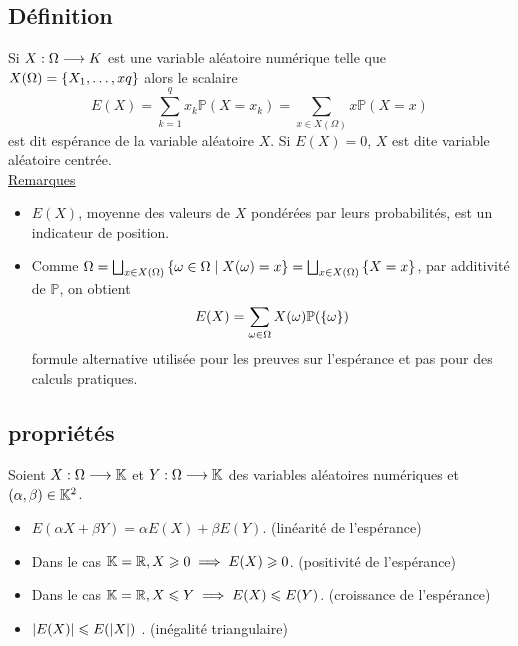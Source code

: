 \subsection{Définition}
\begin{defprop}
    Si \(X : \Omega \to \\K\) est une variable aléatoire numérique telle que \(X(\Omega) = \accol{X_1, \dots , xq}\) alors le scalaire
        \[E(X) = \sum^q_{k=1} x_k\mathbb{P}(X = x_k) = \sum_{x\in X(\Omega)}x\mathbb{P}(X = x)\]
    est dit espérance de la variable aléatoire \(X\). Si \(E(X) = 0\), \(X\) est dite variable aléatoire centrée.\\
    \underline{Remarques}\\
    \begin{itemize}
        \item \(E(X)\), moyenne des valeurs de \(X\) pondérées par leurs probabilités, est un indicateur de position.
        \item Comme \(\Omega = \bigsqcup _{x\in X(\Omega)} \accol{\omega \in  \Omega \tq X(\omega) = x} = \bigsqcup _{x\in X(\Omega)} \accol{X = x}\), par additivité de \(\mathbb{P}\), on obtient \[E(X) = \sum_{\omega\in \Omega} X(\omega)\mathbb{P} (\accol{\omega})\]
        formule alternative utilisée pour les preuves sur l’espérance et pas pour des calculs pratiques.
    \end{itemize}
\end{defprop}
\subsection{propriétés}
\begin{prop}
    Soient \(X : \Omega \to \K\) et \(Y : \Omega \to \K\) des variables aléatoires numériques et \((\alpha , \beta ) \in  \K^2\).
    \begin{itemize}
        \item \(E(\alpha X + \beta Y ) = \alpha E(X) + \beta E(Y ).\) \hfill (linéarité de l’espérance)
        \item Dans le cas \(\K = \R, X \geq 0 \imp E(X) \geq 0\). \hfill (positivité de l’espérance)
        \item Dans le cas \(\K = \R, X \leq Y \imp E(X) \leq E(Y )\). \hfill(croissance de l’espérance)
        \item \(\abs{E (X)} \leq E (\abs{X})\) . \hfill (inégalité triangulaire)
    \end{itemize}
\end{prop}
